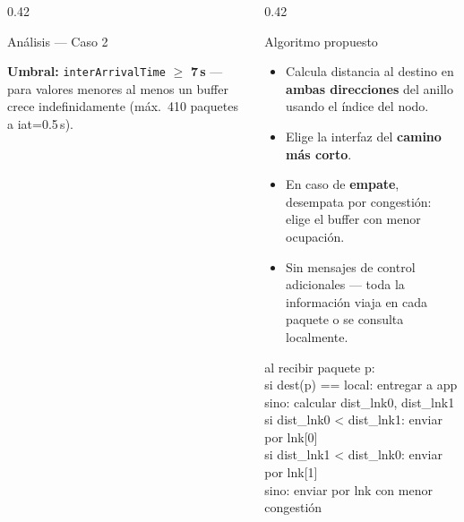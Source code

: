 \documentclass[final]{beamer}
\begin{document}
\begin{frame}[t]
\begin{columns}[T,totalwidth=0.96\paperwidth]
\begin{column}{0.42\paperwidth}
\begin{block}{Análisis — Caso 2}
    \vspace{0.35cm}

    \vspace{0.75cm}
    \raggedright
    \textbf{Umbral:} \texttt{interArrivalTime} $\geq$ \textbf{7\,s} — para valores menores al menos un buffer crece indefinidamente (máx.\ 410 paquetes a iat=0.5\,s).
  \end{block}

\end{column}

\begin{column}{0.42\paperwidth}

  \begin{block}{Algoritmo propuesto}
    \begin{itemize}
      \item Calcula distancia al destino en \textbf{ambas direcciones} del anillo usando el índice del nodo.
      \item Elige la interfaz del \textbf{camino más corto}.
      \item En caso de \textbf{empate}, desempata por congestión: elige el buffer con menor ocupación.
      \item Sin mensajes de control adicionales — toda la información viaja en cada paquete o se consulta localmente.
    \end{itemize}
    \vspace{0.3cm}
    {\Large\ttfamily
    al recibir paquete p:\\[0.12cm]
    \quad si dest(p) == local: entregar a app\\[0.12cm]
    \quad sino: calcular dist\_lnk0, dist\_lnk1\\[0.12cm]
    \quad\quad si dist\_lnk0 < dist\_lnk1: enviar por lnk[0]\\[0.12cm]
    \quad\quad si dist\_lnk1 < dist\_lnk0: enviar por lnk[1]\\[0.12cm]
    \quad\quad sino: enviar por lnk con menor congestión
    }
  \end{block}

  \vspace{0.45cm}


\end{column}
\end{columns}
\end{frame}
\end{document}

